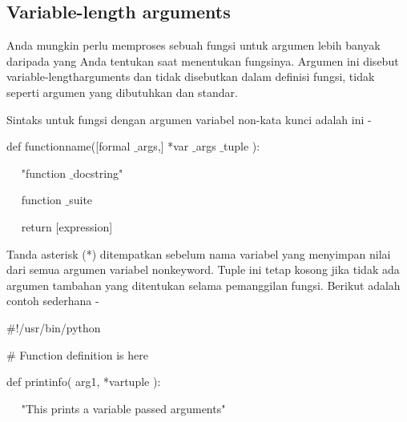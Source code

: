 \documentclass[a4paper,12pt]{report}
\begin{document}
\subsection*{Variable-length arguments}
 \par
\begin{adjustwidth}{0.03in}{0.03in}
Anda mungkin perlu memproses sebuah fungsi untuk argumen lebih banyak daripada yang Anda tentukan saat menentukan fungsinya. Argumen ini disebut variable-lengtharguments dan tidak disebutkan dalam definisi fungsi, tidak seperti argumen yang dibutuhkan dan standar.\end{adjustwidth}
 \par
\begin{adjustwidth}{0.03in}{0.03in}
Sintaks untuk fungsi dengan argumen variabel non-kata kunci adalah ini -\end{adjustwidth}
 \par
\noindent 
 \hspace*{0.5in} def functionname([formal $  \_  $args,] *var $  \_  $args $  \_  $tuple ): \par
\noindent 
 \hspace*{0.5in} ~~ "function $  \_  $docstring" \par
\noindent 
 \hspace*{0.5in} ~~ function $  \_  $suite \par
\noindent 
 \hspace*{0.5in} ~~ return [expression] \par
\begin{adjustwidth}{0.03in}{0.03in}
Tanda asterisk (*) ditempatkan sebelum nama variabel yang menyimpan nilai dari semua argumen variabel nonkeyword. Tuple ini tetap kosong jika tidak ada argumen tambahan yang ditentukan selama pemanggilan fungsi. Berikut adalah contoh sederhana -\end{adjustwidth}
 \par
\noindent 
 \hspace*{0.5in}  $  \#  $!/usr/bin/python \par
\vspace{12pt}
\noindent 
 \hspace*{0.5in}  $  \#  $ Function definition is here \par
\noindent 
 \hspace*{0.5in} def printinfo( arg1, *vartuple ): \par
\noindent 
 \hspace*{0.5in} ~~ "This prints a variable passed arguments" \par
\end{document}
